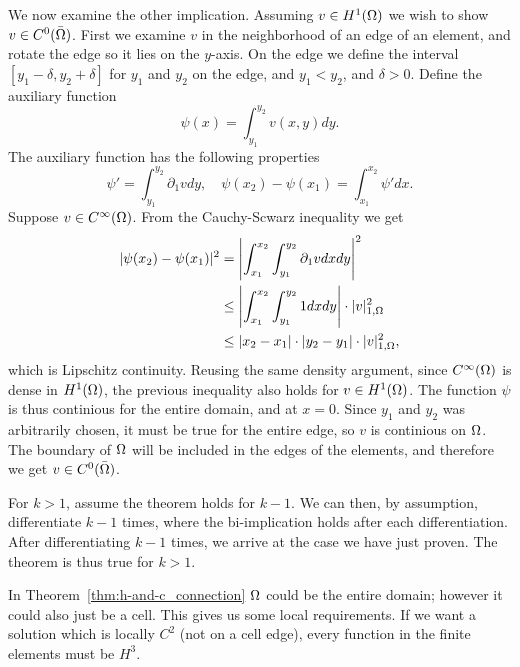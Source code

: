 \begin{bev}
    We now examine the other implication. 
    Assuming $v\in H^1(\Omega)$ we wish to show $v \in C^0(\bar{\Omega})$. 
    First we examine $v$ in the neighborhood of an edge of an element, and rotate the edge so it lies on the $y$-axis. 
    On the edge we define the interval $[y_1-\delta, y_2+\delta]$ for $y_1$ and $y_2$ on the edge, and $y_1<y_2$, and 
    $\delta > 0$.
    Define the auxiliary function
    \begin{equation}
        \psi (x) = \int_{y_1}^{y_2} v(x,y) dy.
    \end{equation}
    The auxiliary function has the following properties
    \begin{equation}
        \psi ' =\int_{y_1}^{y_2} \partial_1 v dy, \quad \psi(x_2) - \psi(x_1) =\int_{x_1}^{x_2} \psi ' dx.
    \end{equation}
    Suppose $v \in C^{\infty}(\Omega)$. From the Cauchy-Scwarz inequality we get
    \begin{align}
        |\psi(x_2) -\psi(x_1)|^2 &= \left| \int_{x_1}^{x_2} \int_{y_1}^{y_2} \partial_1 v dx dy \right|^2\\
        &\leq \left| \int_{x_1}^{x_2} \int_{y_1}^{y_2} 1 dx dy \right| \cdot | v |_{1, \Omega}^2\\
        &\leq |x_2 - x_1| \cdot |y_2 - y_1| \cdot | v |_{1, \Omega}^2,
    \end{align}
    which is Lipschitz continuity.
    Reusing the same density argument, since $C^\infty(\Omega)$ is dense in $H^1(\Omega)$, the previous inequality 
    also holds for $v\in H^1(\Omega)$.
    The function $\psi$ is thus continious for the entire domain, and at $x=0$. 
    Since $y_1$ and $y_2$ was arbitrarily chosen, it must be true for the entire edge,
    so $v$ is continious on $\Omega$. 
    The boundary of $\Omega$ will be included in the edges of the elements,
    and therefore we get $v\in C^0(\bar{\Omega})$.

    For $k>1$, assume the theorem holds for $k-1$. We can then, by assumption, differentiate 
    $k-1$ times, where the bi-implication holds after each differentiation. 
    After differentiating $k-1$ times, we arrive at the case we have just proven. 
    The theorem is thus true for $k>1$.
\end{bev}
In Theorem~\ref{thm:h-and-c_connection} $\Omega$ could be the entire domain; 
however it could also just be a cell. This gives us some local requirements. 
If we want a solution which is locally $C^2$ (not on a cell edge), every function in the 
finite elements must be $H^3$.